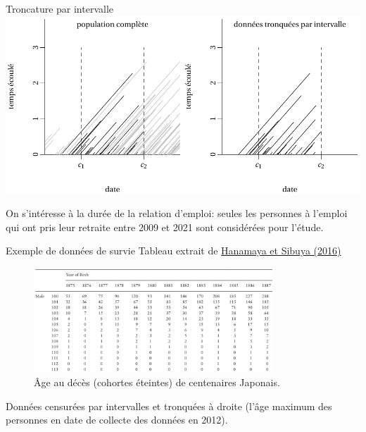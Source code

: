 \documentclass[
  ignorenonframetext,
]{beamer}
\begin{document}
\begin{frame}{Troncature par intervalle}
\protect\hypertarget{troncature-par-intervalle}{}
\includegraphics{figures/lexis_troncationintervalle.pdf}

\footnotesize

On s'intéresse à la durée de la relation d'emploi: seules les personnes
à l'emploi qui ont pris leur retraite entre 2009 et 2021 sont
considérées pour l'étude.
\end{frame}

\begin{frame}{Exemple de données de survie}
\protect\hypertarget{exemple-de-donnuxe9es-de-survie}{}
Tableau extrait de \href{https://doi.org/10.1093/gerona/glv113}{Hanamaya
et Sibuya (2016)}

\begin{figure}

{\centering \includegraphics[width=0.8\textwidth,height=\textheight]{figures/Sibuya_tabular.png}

}

\caption{Âge au décès (cohortes éteintes) de centenaires Japonais.}

\end{figure}

\small

Données censurées par intervalles et tronquées à droite (l'âge maximum
des personnes en date de collecte des données en 2012).

\normalsize
\end{frame}
\end{document}
